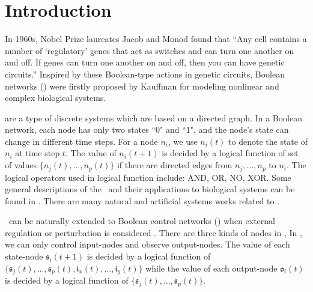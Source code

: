 \section{Introduction}
\label{sec:intro}


In 1960s, Nobel Prize laureates Jacob and Monod found that ``Any cell contains a number of `regulatory' genes that act as switches and can turn one another on and off. If genes can turn one another on and off, then you can have genetic circuits.''\cite{Jacob1961Genetic} Inspired by these Boolean-type actions in genetic circuits, Boolean networks (\BNs) were firstly proposed by Kauffman \cite{Kauffman1968Metabolic} for modeling nonlinear and complex biological systems. 

{\BNs} are a type of discrete systems which are based on a directed graph. In a Boolean network, each node has only two states ``0" and ``1", and
the node's state can change in different time steps.  For a node $n_i$, we use $n_i(t)$ to denote the state of $n_i$ at time step $t$.
%
The value of $n_i(t+1)$ is decided by a logical function of  set of  values  $\{n_j(t),\ldots,n_p(t)\}$ if  there are directed edges from $n_j,\ldots,n_p$ to $n_i$.  %
 The logical operators used in  logical function include: AND, OR, NO, XOR. %
Some general descriptions of the \BNs\ and their applications to biological systems can be found in \cite{Kauffman1968Metabolic}.
There are many natural and artificial systems works \cite{Akutsu2000Inferring, Shmulevich2002From, Faur2006Dynamical,Green2007The,Lou2010Multi} related to \BNs.
 

\BNs\ can be naturally extended to Boolean control networks (\BCNs) when external regulation or perturbation is considered \cite{Ideker2001A}. There are three kinds of nodes in \BCNs,  In \BCNs, we can only control input-nodes and observe output-nodes. 
The value of each state-node $\mathfrak{s}_i(t+1)$ is decided by a logical function of  $\{\mathfrak{s}_j(t),\ldots,\mathfrak{s}_p(t),\mathfrak{i}_x(t),\ldots,\mathfrak{i}_y(t)\}$  %
while the value of each output-node $\mathfrak{o}_i(t)$ is decided by a logical function of   $\{\mathfrak{s}_j(t),\ldots,\mathfrak{s}_p(t)\}$. 

